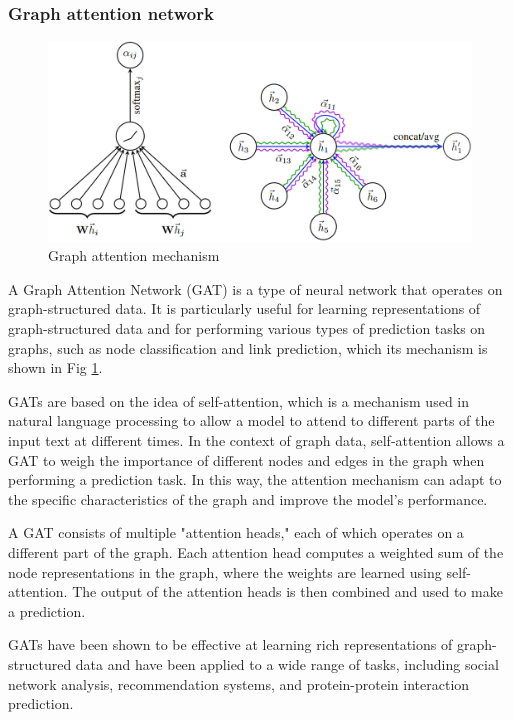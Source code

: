\documentclass[sigconf]{acmart}
\begin{document}
{\subsubsection{Graph attention network}
\begin{figure}[h]
    \centering
    \includegraphics[width=1\linewidth]{figure/gat.png}
    \caption{Graph attention mechanism\cite{velivckovic2017graph}}
    \label{gat}
\end{figure}
A Graph Attention Network (GAT) is a type of neural network that operates on graph-structured data\cite{velivckovic2017graph}. It is particularly useful for learning representations of graph-structured data and for performing various types of prediction tasks on graphs, such as node classification and link prediction, which its mechanism is shown in Fig \ref{gat}.

GATs are based on the idea of self-attention, which is a mechanism used in natural language processing to allow a model to attend to different parts of the input text at different times. In the context of graph data, self-attention allows a GAT to weigh the importance of different nodes and edges in the graph when performing a prediction task. In this way, the attention mechanism can adapt to the specific characteristics of the graph and improve the model's performance.

A GAT consists of multiple "attention heads," each of which operates on a different part of the graph. Each attention head computes a weighted sum of the node representations in the graph, where the weights are learned using self-attention. The output of the attention heads is then combined and used to make a prediction.

GATs have been shown to be effective at learning rich representations of graph-structured data and have been applied to a wide range of tasks, including social network analysis\cite{kosaraju2019social}, recommendation systems\cite{wang2019kgat}, and protein-protein interaction prediction\cite{lai2022accurate}.

}
\end{document}
